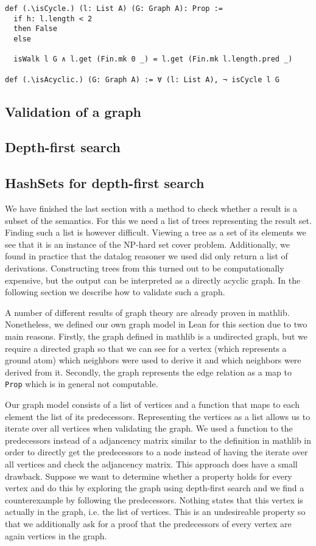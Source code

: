 \begin{lstlisting}
def (.\isCycle.) (l: List A) (G: Graph A): Prop :=
  if h: l.length < 2
  then False
  else

  isWalk l G ∧ l.get (Fin.mk 0 _) = l.get (Fin.mk l.length.pred _)

def (.\isAcyclic.) (G: Graph A) := ∀ (l: List A), ¬ isCycle l G
\end{lstlisting}

\subsection{Validation of a graph}

\subsection{Depth-first search}

\subsection{HashSets for depth-first search}

We have finished the last section with a method to check whether a result is a subset of the semantics. For this we need a list of trees representing the result set. Finding such a list is however difficult. Viewing a tree as a set of its elements we see that it is an instance of the NP-hard set cover problem. Additionally, we found in practice that the datalog reasoner we used did only return a list of derivations. Constructing trees from this turned out to be computationally expensive, but the output can be interpreted as a directly acyclic graph. In the following section we describe how to validate such a graph.

A number of different results of graph theory are already proven in mathlib. Nonetheless, we defined our own graph model in Lean for this section due to two main reasons. Firstly, the graph defined in mathlib is a undirected graph, but we require a directed graph so that we can see for a vertex (which represents a ground atom) which neighbors were used to derive it and which neighbors were derived from it. Secondly, the graph represents the edge relation as a map to \texttt{Prop} which is in general not computable.


Our graph model consists of a list of vertices and a function that maps to each element the list of its predecessors. Representing the vertices as a list allows us to iterate over all vertices when validating the graph. We used a function to the predecessors instead of a adjancency matrix similar to the definition in mathlib in order to directly get the predecessors to a node instead of having the iterate over all vertices and check the adjancency matrix. This approach does have a small drawback. Suppose we want to determine whether a property holds for every vertex and do this by exploring the graph using depth-first search and we find a counterexample by following the predecessors. Nothing states that this vertex is actually in the graph, i.e. the list of vertices. This is an undesireable property so that we additionally ask for a proof that the predecessors of every vertex are again vertices in the graph.

